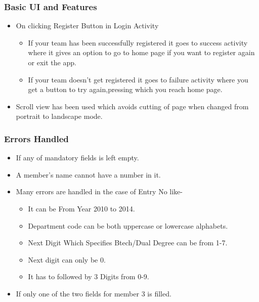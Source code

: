 \documentclass{beamer}
\begin{document}
\begin{frame}
\frametitle{\hspace{4cm}Basic UI and Features}
\begin{itemize}
\item On clicking Register Button in Login Activity
\begin{itemize}
\item If your team has been successfully registered it goes to success activity where it gives an option to go to home page if you want to register again or exit the app.
\item If your team doesn't get registered it goes to failure activity where you get a button to try again,pressing which you reach home page.
\end{itemize}
 \item Scroll view has been used which avoids cutting of page when changed from portrait to landscape mode.
\end{itemize}
\end{frame}


\begin{frame}
\frametitle{ \hspace{4.5cm}Errors Handled }
\begin{itemize}
\item If any of mandatory fields is left empty. 
\item A  member's name cannot have a number in it. 
\item Many errors are handled in the case of Entry No like-
\begin{itemize}
\item It can be From Year 2010 to 2014.
\item Department code can be both uppercase or lowercase alphabets.
\item Next Digit Which Specifies Btech/Dual Degree can be from 1-7.
\item Next digit can only be 0.
\item It has to followed by 3 Digits from 0-9.
\end{itemize}
\item If only one of the two fields for member 3 is filled.
\end{itemize}
\end{frame}
\end{document}
